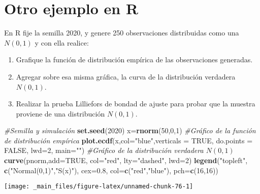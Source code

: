 \documentclass[a4paper,oneside,openany]{book}
\newenvironment{Shaded}{\begin{snugshade}}{\end{snugshade}}
\newcommand{\KeywordTok}[1]{\textcolor[rgb]{0.13,0.29,0.53}{\textbf{#1}}}
\newcommand{\DataTypeTok}[1]{\textcolor[rgb]{0.13,0.29,0.53}{#1}}
\newcommand{\DecValTok}[1]{\textcolor[rgb]{0.00,0.00,0.81}{#1}}
\newcommand{\FloatTok}[1]{\textcolor[rgb]{0.00,0.00,0.81}{#1}}
\newcommand{\StringTok}[1]{\textcolor[rgb]{0.31,0.60,0.02}{#1}}
\newcommand{\CommentTok}[1]{\textcolor[rgb]{0.56,0.35,0.01}{\textit{#1}}}
\newcommand{\OtherTok}[1]{\textcolor[rgb]{0.56,0.35,0.01}{#1}}
\newcommand{\NormalTok}[1]{#1}
\begin{document}
\section{Otro ejemplo en R}\label{otro-ejemplo-en-r-1}

En R fije la semilla 2020, y genere 250 observaciones distribuidas como
una \(N(0, 1)\) y con ella realice:

\begin{enumerate}
\item Grafique la función de distribución empírica de las observaciones generadas.
\item Agregar sobre esa misma gráfica, la curva de la distribución verdadera $N(0,1)$. 
\item Realizar la prueba Lilliefors de bondad de ajuste para probar que la muestra proviene de una distribución $N(0,1)$.
\end{enumerate}

\begin{Shaded}
\begin{Highlighting}[]
\CommentTok{#Semilla y simulación}
\KeywordTok{set.seed}\NormalTok{(}\DecValTok{2020}\NormalTok{)}
\NormalTok{x=}\KeywordTok{rnorm}\NormalTok{(}\DecValTok{50}\NormalTok{,}\DecValTok{0}\NormalTok{,}\DecValTok{1}\NormalTok{)}
\CommentTok{#Gráfico de la función de distribución empírica}
\KeywordTok{plot.ecdf}\NormalTok{(x,}\DataTypeTok{col=}\StringTok{"blue"}\NormalTok{,}\DataTypeTok{verticals =} \OtherTok{TRUE}\NormalTok{, }\DataTypeTok{do.points =} \OtherTok{FALSE}\NormalTok{, }\DataTypeTok{lwd=}\DecValTok{2}\NormalTok{, }\DataTypeTok{main=}\StringTok{""}\NormalTok{)}
\CommentTok{#Gráfico de la distribución verdadera $N(0,1)$}
\KeywordTok{curve}\NormalTok{(pnorm,}\DataTypeTok{add=}\OtherTok{TRUE}\NormalTok{, }\DataTypeTok{col=}\StringTok{"red"}\NormalTok{, }\DataTypeTok{lty=}\StringTok{"dashed"}\NormalTok{, }\DataTypeTok{lwd=}\DecValTok{2}\NormalTok{)}
\KeywordTok{legend}\NormalTok{(}\StringTok{"topleft"}\NormalTok{, }\KeywordTok{c}\NormalTok{(}\StringTok{"Normal(0,1)"}\NormalTok{,}\StringTok{"S(x)"}\NormalTok{), }\DataTypeTok{cex=}\FloatTok{0.8}\NormalTok{, }\DataTypeTok{col=}\KeywordTok{c}\NormalTok{(}\StringTok{"red"}\NormalTok{,}\StringTok{"blue"}\NormalTok{), }\DataTypeTok{pch=}\KeywordTok{c}\NormalTok{(}\DecValTok{16}\NormalTok{,}\DecValTok{16}\NormalTok{))}
\end{Highlighting}
\end{Shaded}

\begin{center}\texttt{[image: \_main\_files/figure-latex/unnamed-chunk-76-1]} \end{center}
\end{document}
